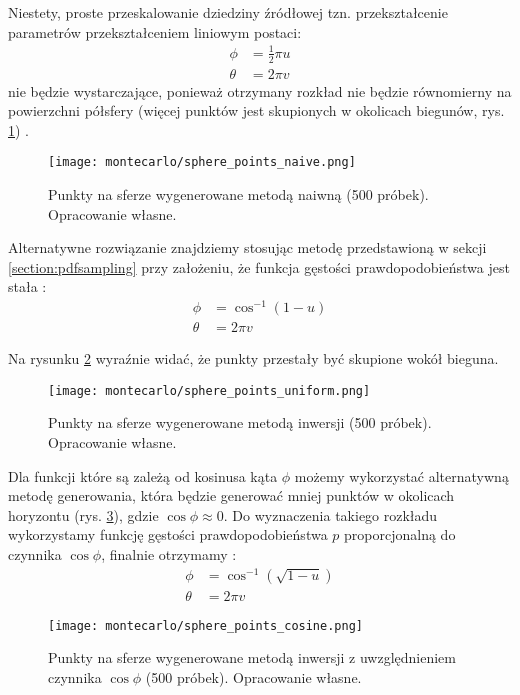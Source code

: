 \documentclass[../main.tex]{subfiles}
\begin{document}
Niestety, proste przeskalowanie dziedziny źródłowej tzn. przekształcenie parametrów przekształceniem liniowym postaci:
\begin{align*}
	\phi &= \frac{1}{2} \pi u \\
 	\theta &= 2 \pi v
\end{align*}
\noindent nie będzie wystarczające, ponieważ otrzymany rozkład nie będzie równomierny na powierzchni półsfery (więcej punktów jest skupionych w okolicach biegunów, rys. \ref{fig:SpherePointsNaive}) \cite{WolframSpherePointPicking}.

\begin{figure}[h]
    \centering
    \texttt{[image: montecarlo/sphere\_points\_naive.png]}
    \caption{Punkty na sferze wygenerowane metodą naiwną (500 próbek). Opracowanie własne.}
    \label{fig:SpherePointsNaive}
\end{figure}

Alternatywne rozwiązanie znajdziemy stosując metodę przedstawioną w sekcji \ref{section:pdfsampling}  przy założeniu, że funkcja gęstości prawdopodobieństwa jest stała \cite{dammertz_2012, AdvancedCGRenderingEq}:
\begin{align*}
	\phi &= \cos^{-1}(1-u) \\
	\theta &= 2 \pi v
\end{align*}

Na rysunku \ref{fig:SpherePointsUniform} wyraźnie widać, że punkty przestały być skupione wokół bieguna.

\begin{figure}[h]
    \centering
    \texttt{[image: montecarlo/sphere\_points\_uniform.png]}
    \caption{Punkty na sferze wygenerowane metodą inwersji (500 próbek). Opracowanie własne.}
    \label{fig:SpherePointsUniform}
\end{figure}

Dla funkcji które są zależą od kosinusa kąta $\phi$ możemy wykorzystać alternatywną metodę generowania, która będzie generować mniej punktów w okolicach horyzontu (rys. \ref{fig:SpherePointsCosine}), gdzie $\cos\phi \approx 0$. Do wyznaczenia takiego rozkładu wykorzystamy funkcję gęstości prawdopodobieństwa $p$ proporcjonalną do czynnika $\cos \phi$, finalnie otrzymamy \cite{AdvancedCGRenderingEq}:
\begin{align*}
  \phi &= \cos^{-1}(\sqrt{1-u}) \\
  \theta &= 2 \pi v
\end{align*}

\begin{figure}[h]
    \centering
    \texttt{[image: montecarlo/sphere\_points\_cosine.png]}
    \caption{Punkty na sferze wygenerowane metodą inwersji z uwzględnieniem czynnika $\cos\phi$ (500 próbek). Opracowanie własne.}
    \label{fig:SpherePointsCosine}
\end{figure}
\end{document}
